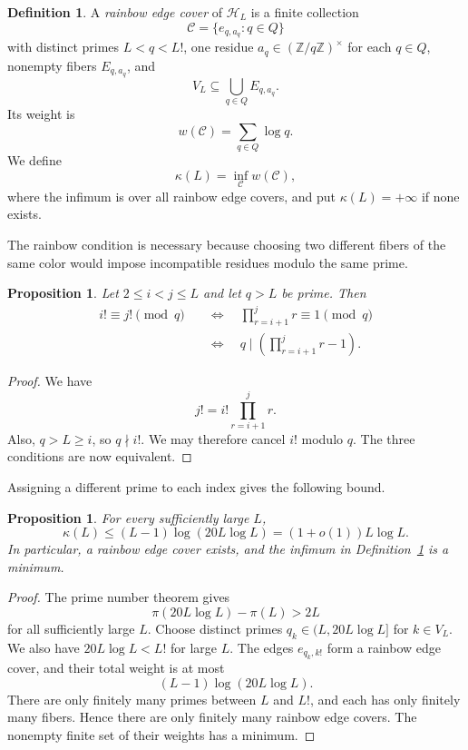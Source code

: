 \documentclass[11pt]{amsart}
\newtheorem{proposition}[theorem]{Proposition}
\theoremstyle{definition}
\newtheorem{definition}[theorem]{Definition}
\theoremstyle{remark}
\begin{document}
\begin{definition}\label{def:cover}
A \emph{rainbow edge cover} of $\mathcal H_L$ is a finite collection
\[
\mathcal C=\{e_{q,a_q}:q\in Q\}
\]
with distinct primes $L<q<L!$, one residue $a_q\in(\mathbb Z/q\mathbb Z)^\times$
for each $q\in Q$, nonempty fibers $E_{q,a_q}$, and
\[
V_L\subseteq\bigcup_{q\in Q}E_{q,a_q}.
\]
Its weight is
\[
w(\mathcal C)=\sum_{q\in Q}\log q.
\]
We define
\[
\kappa(L)=\inf_{\mathcal C}w(\mathcal C),
\]
where the infimum is over all rainbow edge covers, and put
$\kappa(L)=+\infty$ if none exists.
\end{definition}

The rainbow condition is necessary because choosing two different fibers of
the same color would impose incompatible residues modulo the same prime.

\begin{proposition}\label{prop:criterion}
Let $2\leq i<j\leq L$ and let $q>L$ be prime.  Then
\[
\begin{aligned}
i!\equiv j!\pmod q
&\quad\Longleftrightarrow\quad
\prod_{r=i+1}^{j}r\equiv1\pmod q\\
&\quad\Longleftrightarrow\quad
q\mid\left(\prod_{r=i+1}^{j}r-1\right).
\end{aligned}
\]
\end{proposition}

\begin{proof}
We have
\[
j!=i!\prod_{r=i+1}^{j}r.
\]
Also, $q>L\geq i$, so $q\nmid i!$.  We may therefore cancel $i!$ modulo
$q$.  The three conditions are now equivalent.
\end{proof}

Assigning a different prime to each index gives the following bound.

\begin{proposition}\label{prop:baseline}
For every sufficiently large $L$,
\[
\kappa(L)\leq(L-1)\log(20L\log L)
=(1+o(1))L\log L.
\]
In particular, a rainbow edge cover exists, and the infimum in
Definition~\ref{def:cover} is a minimum.
\end{proposition}

\begin{proof}
The prime number theorem gives
\[
\pi(20L\log L)-\pi(L)>2L
\]
for all sufficiently large $L$.  Choose distinct primes
$q_k\in(L,20L\log L]$ for $k\in V_L$.  We also have
$20L\log L<L!$ for large $L$.  The edges $e_{q_k,k!}$ form a rainbow edge
cover, and their total weight is at most
\[
(L-1)\log(20L\log L).
\]
There are only finitely many primes between $L$ and $L!$, and each has only
finitely many fibers.  Hence there are only finitely many rainbow edge covers.
The nonempty finite set of their weights has a minimum.
\end{proof}
\end{document}

